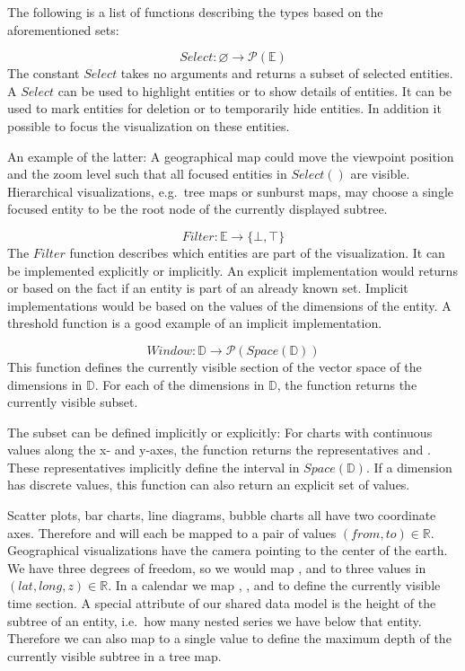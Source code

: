 The following is a list of functions describing the types based on the aforementioned sets:

\begin{equation} Select: \varnothing \rightarrow \mathcal{P}(\mathbb{E}) \end{equation}
  The constant $Select$ takes no arguments and returns a subset of selected entities.
  A $Select$ can be used to highlight entities or to show details of entities.
  It can be used to mark entities for deletion or to temporarily hide entities.
  In addition it possible to focus the visualization on these entities.

  An example of the latter:
  A geographical map could move the viewpoint position and the zoom level such that all focused entities in $Select()$ are visible.
  Hierarchical visualizations, e.g.\ tree maps or sunburst maps, may choose a single focused entity to be the root node of the currently displayed subtree.

\begin{equation} Filter: \mathbb{E} \rightarrow \{ \bot, \top \} \end{equation}
  The $Filter$ function describes which entities are part of the visualization.
  It can be implemented explicitly or implicitly.
  An explicit implementation would returns  or  based on the fact if an entity is part of an already known set.
  Implicit implementations would be based on the values of the dimensions of the entity.
  A threshold function is a good example of an implicit implementation.

\begin{equation} Window: \mathbb{D} \rightarrow \mathcal{P}(Space(\mathbb{D})) \end{equation}
  This function defines the currently visible section of the vector space of the dimensions in $\mathbb{D}$.
  For each of the dimensions in $\mathbb{D}$, the function returns the currently visible subset.

  The subset can be defined implicitly or explicitly:
  For charts with continuous values along the x- and y-axes, the function returns the representatives  and .
  These representatives implicitly define the interval in $Space(\mathbb{D})$.
  If a dimension has discrete values, this function can also return an explicit set of values.

  Scatter plots, bar charts, line diagrams, bubble charts all have two coordinate axes.
  Therefore  and  will each be mapped to a pair of values $(from,to) \in \mathbb{R}$.
  Geographical visualizations have the camera pointing to the center of the earth.
  We have three degrees of freedom, so we would map ,  and  to three values in $(lat,long,z) \in \mathbb{R}$.
  In a calendar we map , ,  and  to define the currently visible time section.
  A special attribute of our shared data model is the height of the subtree of an entity, i.e.\ how many nested series we have below that entity.
  Therefore we can also map  to a single value to define the maximum depth of the currently visible subtree in a tree map.

